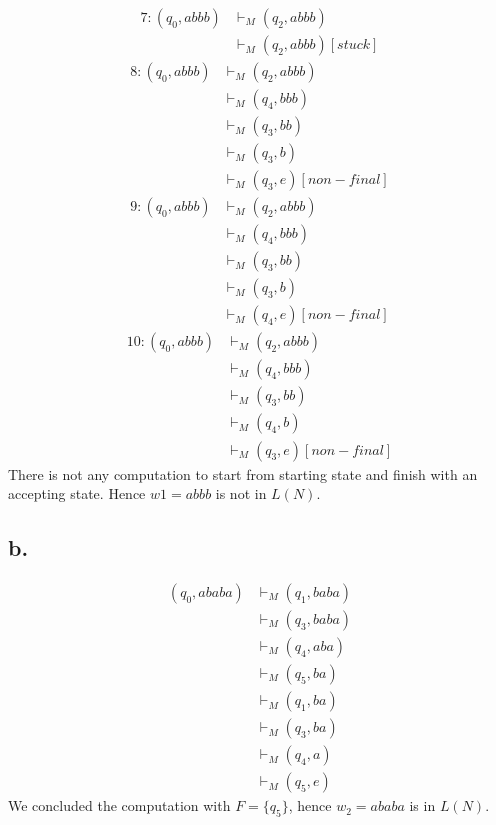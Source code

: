 \documentclass[12pt]{article}
\begin{document}
\begin{align*}
    7: (q_0, abbb) & \vdash_M (q_2, abbb) \\
    & \vdash_M (q_2, abbb) [stuck]
\end{align*}
\begin{align*}
    8: (q_0, abbb) & \vdash_M (q_2, abbb) \\
    & \vdash_M (q_4, bbb)\\
    & \vdash_M (q_3, bb)\\
    & \vdash_M (q_3, b)\\
    & \vdash_M (q_3, e)[non-final]
\end{align*}
\begin{align*}
    9: (q_0, abbb) & \vdash_M (q_2, abbb) \\
    & \vdash_M (q_4, bbb)\\
    & \vdash_M (q_3, bb)\\
    & \vdash_M (q_3, b)\\
    & \vdash_M (q_4, e) [non-final]
\end{align*}
\begin{align*}
    10: (q_0, abbb) & \vdash_M (q_2, abbb) \\
    & \vdash_M (q_4, bbb)\\
    & \vdash_M (q_3, bb)\\
    & \vdash_M (q_4, b)\\
    & \vdash_M (q_3, e) [non-final]
\end{align*}
There is not any computation to start from starting state and finish with an accepting state. Hence $w1 = abbb$ is not in $L(N)$.

\subsection*{b.}
\begin{align*}
    (q_0, ababa) & \vdash_M (q_1, baba) \\
    &\vdash_M (q_3, baba) \\
    &\vdash_M (q_4, aba) \\
    &\vdash_M (q_5, ba) \\
    &\vdash_M (q_1, ba) \\
    &\vdash_M (q_3, ba) \\
    &\vdash_M (q_4, a) \\
    &\vdash_M (q_5, e)
\end{align*}
We concluded the computation with $F = \{q_5\}$, hence $w_2 = ababa$ is in $L(N)$.
\end{document}
